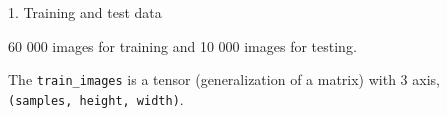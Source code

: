 \documentclass[10pt,ignorenonframetext,]{beamer}
\newenvironment{Shaded}{\begin{snugshade}}{\end{snugshade}}
\newcommand{\CommentTok}[1]{\textcolor[rgb]{0.56,0.35,0.01}{\textit{#1}}}
\newcommand{\NormalTok}[1]{#1}
\newcommand{\OperatorTok}[1]{\textcolor[rgb]{0.81,0.36,0.00}{\textbf{#1}}}
\newcommand{\StringTok}[1]{\textcolor[rgb]{0.31,0.60,0.02}{#1}}
\begin{document}
\begin{frame}[fragile]

\begin{block}{1. Training and test data}

60 000 images for training and 10 000 images for testing.

\scriptsize

\begin{Shaded}
\end{Shaded}

\normalsize

The \texttt{train\_images} is a tensor (generalization of a matrix) with
3 axis, \texttt{(samples,\ height,\ width)}.

\end{block}

\end{frame}
\end{document}
